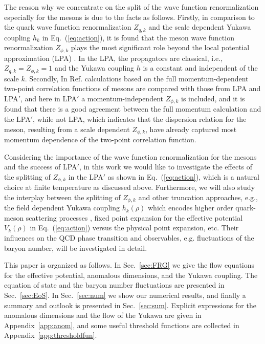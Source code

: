 \documentclass[%
reprint,
superscriptaddress,
showpacs,preprintnumbers,
 amsmath,amssymb,
 aps,
prd,
]{revtex4-1}
\def\Eq#1{Eq.~(\ref{#1})}
\def\sec#1{Sec.~\ref{#1}}
\def\app#1{Appendix~\ref{#1}}
\begin{document}
The reason why we concentrate on the split of the wave function renormalization especially for the mesons is due to the facts as follows. Firstly, in comparison to the quark wave function renormalization $Z_{q,k}$ and the scale dependent Yukawa coupling $h_k$ in \Eq{eq:action}, it is found that the meson wave function renormalization $Z_{\phi,k}$ plays the most significant role beyond the local potential approximation (LPA) \cite{Pawlowski:2014zaa,Fu:2015naa}. In the LPA, the propagators are classical, i.e., $Z_{q,k}=Z_{\phi,k}=1$ and the Yukawa coupling $h$ is a constant and independent of the scale $k$. Secondly, In Ref. \cite{Helmboldt:2014iya} calculations based on the full momentum-dependent two-point correlation functions of mesons are compared with those from LPA and LPA$'$, and here in LPA$'$ a momentum-independent $Z_{\phi,k}$ is included, and it is found that there is a good agreement between the full momentum calculation and the LPA$'$, while not LPA, which indicates that the dispersion relation for the meson, resulting from a scale dependent $Z_{\phi,k}$, have already captured most momentum dependence of the two-point correlation function. 

Considering the importance of the wave function renormalization for the mesons and the success of LPA$'$, in this work we would like to investigate the effects of the splitting of $Z_{\phi,k}$ in the LPA$'$ as shown in \Eq{eq:action}, which is a natural choice at finite temperature as discussed above. Furthermore, we will also study the interplay between the splitting of $Z_{\phi,k}$ and other truncation approaches, e.g., the field dependent Yukawa coupling $h_k(\rho)$ which encodes higher order quark-meson scattering processes \cite{Pawlowski:2014zaa}, fixed point expansion for the effective potential $V_k(\rho)$ in \Eq{eq:action} versus the physical point expansion, etc. Their influences on the QCD phase transition and observables, e.g. fluctuations of the baryon number, will be investigated in detail.

This paper is organized as follows. In \sec{sec:FRG} we give the flow equations for the effective potential, anomalous dimensions, and the Yukawa coupling. The equation of state and the baryon number fluctuations are presented in \sec{sec:EoS}. In \sec{sec:num} we show our numerical results, and finally a summary and outlook is presented in \sec{sec:sum}. Explicit expressions for the anomalous dimensions and the flow of the Yukawa are given in \app{app:anom}, and some useful threshold functions are collected in \app{app:thresholdfun}.
\end{document}
